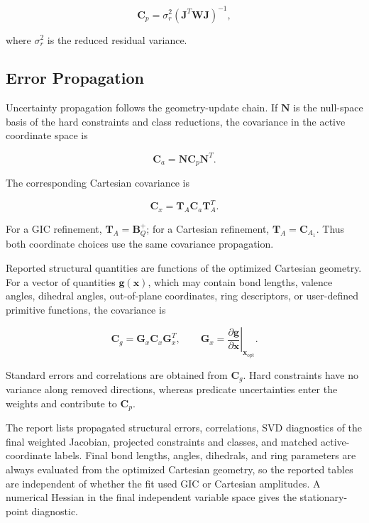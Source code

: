 \documentclass[aip,jcp,reprint,longbibliography,floatfix]{revtex4-2}
\begin{document}
\begin{equation}
\mathbf{C}_{p}
=
\sigma_r^2
\left(
\mathbf{J}^{T}
\mathbf{W}
\mathbf{J}
\right)^{-1},
\end{equation}

where $\sigma_r^2$ is the reduced residual variance.

\subsection{Error Propagation}

Uncertainty propagation follows the geometry-update chain. If $\mathbf{N}$ is
the null-space basis of the hard
constraints and class reductions, the covariance in the active coordinate
space is

\begin{equation}
\mathbf{C}_{a}
=
\mathbf{N}
\mathbf{C}_{p}
\mathbf{N}^{T}.
\end{equation}

The corresponding Cartesian covariance is

\begin{equation}
\mathbf{C}_{x}
=
\mathbf{T}_{A}
\mathbf{C}_{a}
\mathbf{T}_{A}^{T}.
\end{equation}

For a GIC refinement, $\mathbf{T}_{A}=\mathbf{B}_{Q}^{+}$; for a Cartesian
refinement, $\mathbf{T}_{A}=\mathbf{C}_{A_1}$. Thus both coordinate choices use
the same covariance propagation.

Reported structural quantities are functions of the optimized Cartesian
geometry. For a vector of quantities
$\mathbf{g}(\mathbf{x})$, which may contain bond lengths, valence angles,
dihedral angles, out-of-plane coordinates, ring descriptors, or user-defined
primitive functions, the covariance is

\begin{equation}
\mathbf{C}_{g}
=
\mathbf{G}_{x}
\mathbf{C}_{x}
\mathbf{G}_{x}^{T},
\qquad
\mathbf{G}_{x}
=
\left.
\frac{\partial\mathbf{g}}
{\partial\mathbf{x}}
\right|_{\mathbf{x}_{\mathrm{opt}}}.
\end{equation}

Standard errors and correlations are obtained from $\mathbf{C}_{g}$. Hard
constraints have no variance along removed directions, whereas predicate
uncertainties enter the weights and contribute to $\mathbf{C}_{p}$.

The report lists propagated structural errors, correlations, SVD diagnostics of
the final weighted Jacobian, projected constraints and classes, and matched
active-coordinate labels. Final bond lengths, angles, dihedrals, and ring
parameters are always evaluated from the optimized Cartesian geometry, so the
reported tables are independent of whether the fit used GIC or Cartesian
amplitudes. A numerical Hessian in the final independent variable space gives
the stationary-point diagnostic.
\end{document}
